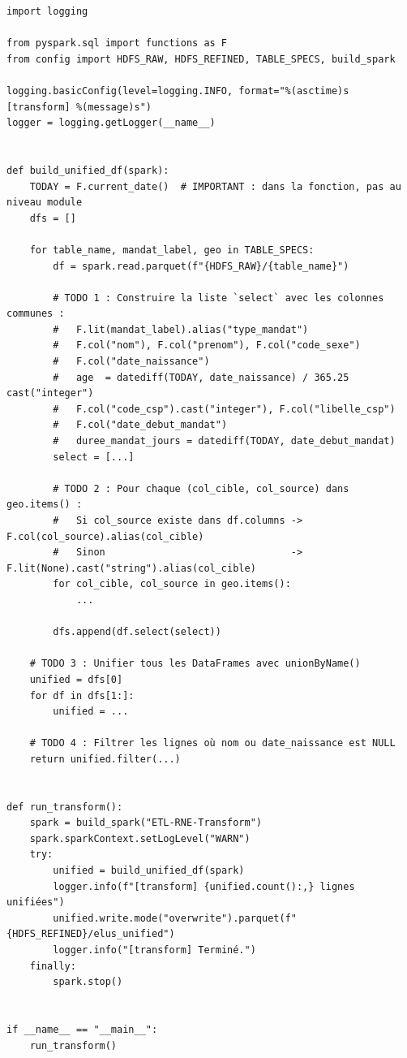 \documentclass[11pt,a4paper]{article}
\begin{document}
\begin{lstlisting}
import logging

from pyspark.sql import functions as F
from config import HDFS_RAW, HDFS_REFINED, TABLE_SPECS, build_spark

logging.basicConfig(level=logging.INFO, format="%(asctime)s [transform] %(message)s")
logger = logging.getLogger(__name__)


def build_unified_df(spark):
    TODAY = F.current_date()  # IMPORTANT : dans la fonction, pas au niveau module
    dfs = []

    for table_name, mandat_label, geo in TABLE_SPECS:
        df = spark.read.parquet(f"{HDFS_RAW}/{table_name}")

        # TODO 1 : Construire la liste `select` avec les colonnes communes :
        #   F.lit(mandat_label).alias("type_mandat")
        #   F.col("nom"), F.col("prenom"), F.col("code_sexe")
        #   F.col("date_naissance")
        #   age  = datediff(TODAY, date_naissance) / 365.25  cast("integer")
        #   F.col("code_csp").cast("integer"), F.col("libelle_csp")
        #   F.col("date_debut_mandat")
        #   duree_mandat_jours = datediff(TODAY, date_debut_mandat)
        select = [...]

        # TODO 2 : Pour chaque (col_cible, col_source) dans geo.items() :
        #   Si col_source existe dans df.columns -> F.col(col_source).alias(col_cible)
        #   Sinon                                -> F.lit(None).cast("string").alias(col_cible)
        for col_cible, col_source in geo.items():
            ...

        dfs.append(df.select(select))

    # TODO 3 : Unifier tous les DataFrames avec unionByName()
    unified = dfs[0]
    for df in dfs[1:]:
        unified = ...

    # TODO 4 : Filtrer les lignes où nom ou date_naissance est NULL
    return unified.filter(...)


def run_transform():
    spark = build_spark("ETL-RNE-Transform")
    spark.sparkContext.setLogLevel("WARN")
    try:
        unified = build_unified_df(spark)
        logger.info(f"[transform] {unified.count():,} lignes unifiées")
        unified.write.mode("overwrite").parquet(f"{HDFS_REFINED}/elus_unified")
        logger.info("[transform] Terminé.")
    finally:
        spark.stop()


if __name__ == "__main__":
    run_transform()
\end{lstlisting}
\end{document}
